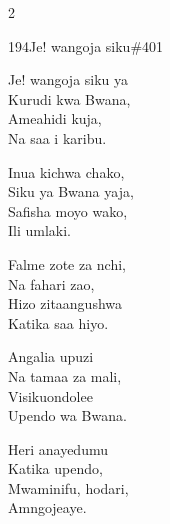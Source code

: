 \begin{multicols}{2}
\begin{hymn}{194}{Je! wangoja siku}{\#401}
\begin{stanza}
Je! wangoja siku ya\\
Kurudi kwa Bwana,\\
Ameahidi kuja,\\
Na saa i karibu.
\end{stanza}
\begin{chorus}
Inua kichwa chako,\\
Siku ya Bwana yaja,\\
Safisha moyo wako,\\
Ili umlaki.
\end{chorus}
\begin{stanza}
Falme zote za nchi,\\
Na fahari zao,\\
Hizo zitaangushwa\\
Katika saa hiyo.
\end{stanza}
\begin{stanza}
Angalia upuzi\\
Na tamaa za mali,\\
Visikuondolee\\
Upendo wa Bwana.
\end{stanza}
\begin{stanza}
Heri anayedumu\\
Katika upendo,\\
Mwaminifu, hodari,\\
Amngojeaye.
\end{stanza}
\end{hymn}


\end{multicols}
